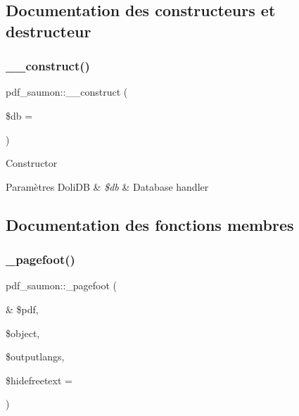 \subsection{Documentation des constructeurs et destructeur}
\mbox{\label{classpdf__saumon_ad75af6ab7895542a39daf5bc0f83037a}} 
\subsubsection{\texorpdfstring{\+\_\+\+\_\+construct()}{\_\_construct()}}
{\footnotesize\ttfamily pdf\+\_\+saumon\+::\+\_\+\+\_\+construct (\begin{DoxyParamCaption}\item[{}]{\$db = {} }\end{DoxyParamCaption})}

Constructor


\begin{DoxyParams}[1]{Paramètres}
Doli\+DB & {\em \$db} & Database handler \\
\hline
\end{DoxyParams}


\subsection{Documentation des fonctions membres}
\mbox{\label{classpdf__saumon_a8d3373b699d9ffcdb811027e61c48665}} 
\subsubsection{\texorpdfstring{\+\_\+pagefoot()}{\_pagefoot()}}
{\footnotesize\ttfamily pdf\+\_\+saumon\+::\+\_\+pagefoot (\begin{DoxyParamCaption}\item[{\&}]{\$pdf,  }\item[{}]{\$object,  }\item[{}]{\$outputlangs,  }\item[{}]{\$hidefreetext = {} }\end{DoxyParamCaption})}

